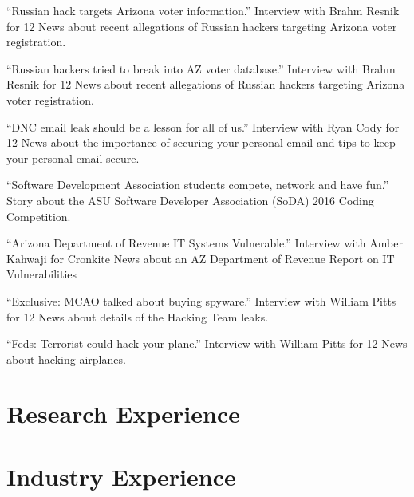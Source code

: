 \documentclass[11pt,letterpaper,sans]{moderncv}
\begin{document}
 {``Russian hack targets Arizona voter
  information.'' Interview with Brahm Resnik for 12 News about recent allegations of Russian hackers targeting Arizona voter registration.}

 {``Russian hackers tried to break into AZ
  voter database.'' Interview with Brahm Resnik for 12 News about recent allegations of Russian hackers targeting Arizona voter registration.}

 {``DNC email leak should be a lesson for all
  of us.'' Interview with Ryan Cody for 12 News about the importance of securing your personal email and tips to keep your personal email secure.}

 {``Software Development Association students
  compete, network and have fun.'' Story about the ASU Software Developer Association (SoDA) 2016 Coding Competition.}

 {``Arizona Department of Revenue IT Systems
  Vulnerable.'' Interview with Amber Kahwaji for Cronkite News about an AZ Department of Revenue Report on IT Vulnerabilities}

 {``Exclusive: MCAO talked about buying
  spyware.'' Interview with William Pitts for 12 News about details of the Hacking Team leaks.}

 {``Feds: Terrorist could hack your plane.'' Interview with William Pitts for 12 News about hacking airplanes.}



\section{Research Experience}



\section{Industry Experience}

\end{document}
